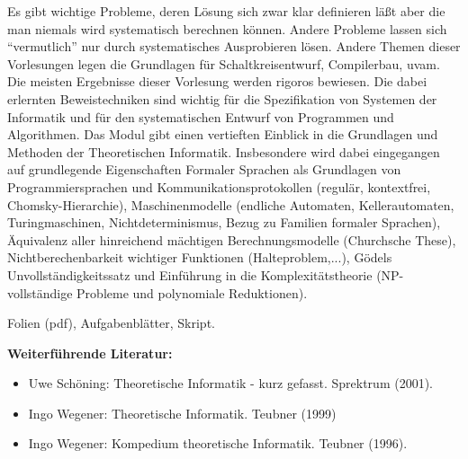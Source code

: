 \begin{course}
\begin{content}
Es gibt wichtige Probleme, deren Lösung sich zwar klar definieren läßt aber die man niemals wird systematisch berechnen können. Andere Probleme lassen sich “vermutlich” nur durch systematisches Ausprobieren lösen. Andere Themen dieser Vorlesungen legen die Grundlagen für Schaltkreisentwurf, Compilerbau, uvam. Die meisten Ergebnisse dieser Vorlesung werden rigoros bewiesen. Die dabei erlernten Beweistechniken sind wichtig für die Spezifikation von Systemen der Informatik und für den systematischen Entwurf von Programmen und Algorithmen. \newline
Das Modul gibt einen vertieften Einblick in die Grundlagen und Methoden der Theoretischen Informatik. Insbesondere wird dabei eingegangen auf grundlegende Eigenschaften Formaler Sprachen als Grundlagen von Programmiersprachen und Kommunikationsprotokollen (regulär, kontextfrei, Chomsky-Hierarchie), Maschinenmodelle (endliche Automaten, Kellerautomaten, Turingmaschinen, Nichtdeterminismus, Bezug zu Familien formaler Sprachen), Äquivalenz aller hinreichend mächtigen Berechnungsmodelle (Churchsche These), Nichtberechenbarkeit wichtiger Funktionen (Halteproblem,...), Gödels Unvollständigkeitssatz und Einführung in die Komplexitätstheorie (NP-vollständige Probleme und polynomiale Reduktionen).


\end{content}

\begin{media}Folien (pdf), Aufgabenblätter, Skript.

\end{media}

\begin{literature}\textbf{Weiterführende Literatur:}

 \begin{itemize}\item Uwe Schöning: Theoretische Informatik - kurz gefasst. Sprektrum (2001).  \item Ingo Wegener: Theoretische Informatik. Teubner (1999)  \item Ingo Wegener: Kompedium theoretische Informatik. Teubner (1996).  \end{itemize}\end{literature}



\end{course}
